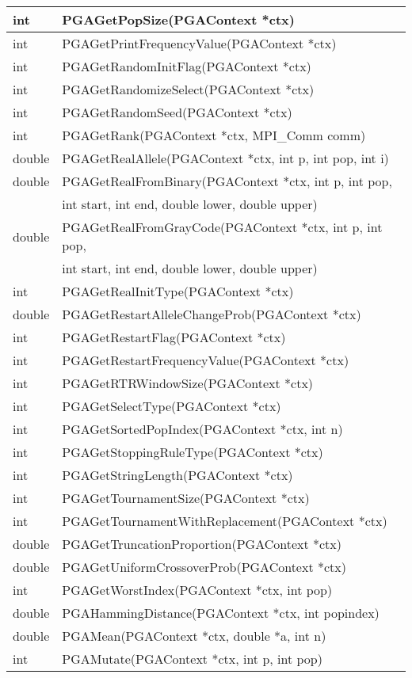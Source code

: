 \documentclass{report}
\begin{document}
\begin{tabular}{|l|l|}
int &  PGAGetPopSize(PGAContext *ctx) \\ \hline
int &  PGAGetPrintFrequencyValue(PGAContext *ctx) \\ \hline
int &  PGAGetRandomInitFlag(PGAContext *ctx) \\ \hline
int &  PGAGetRandomizeSelect(PGAContext *ctx) \\ \hline
int &  PGAGetRandomSeed(PGAContext *ctx) \\ \hline
int &  PGAGetRank(PGAContext *ctx, MPI\_Comm comm) \\ \hline
double &  PGAGetRealAllele(PGAContext *ctx, int p, int pop, int i) \\ \hline
double &  PGAGetRealFromBinary(PGAContext *ctx, int p, int pop, \\
       &  int start, int end, double lower, double upper) \\ \hline
double &  PGAGetRealFromGrayCode(PGAContext *ctx, int p, int pop, \\
       &  int start, int end, double lower, double upper) \\ \hline
int &  PGAGetRealInitType(PGAContext *ctx) \\ \hline
double &  PGAGetRestartAlleleChangeProb(PGAContext *ctx) \\ \hline
int &  PGAGetRestartFlag(PGAContext *ctx) \\ \hline
int &  PGAGetRestartFrequencyValue(PGAContext *ctx) \\ \hline
int &  PGAGetRTRWindowSize(PGAContext *ctx) \\ \hline
int &  PGAGetSelectType(PGAContext *ctx) \\ \hline
int &  PGAGetSortedPopIndex(PGAContext *ctx, int n) \\ \hline
int &  PGAGetStoppingRuleType(PGAContext *ctx) \\ \hline
int &  PGAGetStringLength(PGAContext *ctx) \\ \hline
int &  PGAGetTournamentSize(PGAContext *ctx) \\ \hline
int &  PGAGetTournamentWithReplacement(PGAContext *ctx) \\ \hline
double &  PGAGetTruncationProportion(PGAContext *ctx) \\ \hline
double &  PGAGetUniformCrossoverProb(PGAContext *ctx) \\ \hline
int &  PGAGetWorstIndex(PGAContext *ctx, int pop) \\ \hline
double &  PGAHammingDistance(PGAContext *ctx, int popindex) \\ \hline
double &  PGAMean(PGAContext *ctx, double *a, int n) \\ \hline
int &  PGAMutate(PGAContext *ctx, int p, int pop) \\ \hline
\end{tabular}
\end{document}
